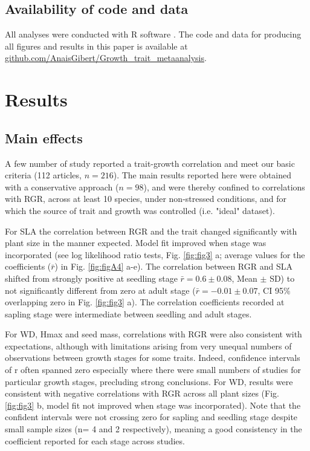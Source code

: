 \documentclass[a4paper,11pt]{article}
\newcommand{\smurl}[1]{\url{#1}}
\begin{document}
\subsection*{Availability of code and data}\label{code}

All analyses were conducted with R software \citep{Ralanguageanden:2014wf}. The code and data for producing all figures and results in this paper is available at \smurl{github.com/AnaisGibert/Growth\_trait\_metaanalysis}.

\section*{Results}\label{results}

\subsection*{Main effects}

A few number of study reported a trait-growth correlation and meet our basic criteria (112 articles, $n = 216$). The main results reported here were obtained with a conservative approach ($n = 98$), and were thereby confined to correlations with RGR, across at least 10 species, under non-stressed conditions, and for which the source of trait and growth was controlled (i.e. "ideal" dataset).

For SLA the correlation between RGR and the trait changed significantly with plant size in the manner expected. Model fit improved when stage was incorporated (see log likelihood ratio tests, Fig. \ref{fig:fig3} a; average values for the coefficients ($\bar{r}$) in Fig. \ref{fig:figA4} a-e). The correlation between RGR and SLA shifted from strongly positive at seedling stage $\bar{r}=0.6 \pm 0.08$, Mean $\pm$ SD) to not significantly different from zero at adult stage ($\bar{r}= -0.01 \pm 0.07$, CI 95\% overlapping zero in Fig. \ref{fig:fig3} a). The correlation coefficients recorded at sapling stage were intermediate between seedling and adult stages. 

For WD, Hmax and seed mass, correlations with RGR were also consistent with expectations, although with limitations arising from very unequal numbers of observations between growth stages for some traits. Indeed, confidence intervals of r often spanned zero especially where there were small numbers of studies for particular growth stages, precluding strong conclusions. 
For WD, results were consistent with negative correlations with RGR across all plant sizes (Fig. \ref{fig:fig3} b, model fit not improved when stage was incorporated). Note that the confident intervals were not crossing zero for sapling and seedling stage despite small sample sizes (n= 4 and 2 respectively), meaning a good consistency in the coefficient reported for each stage across studies.
\end{document}
